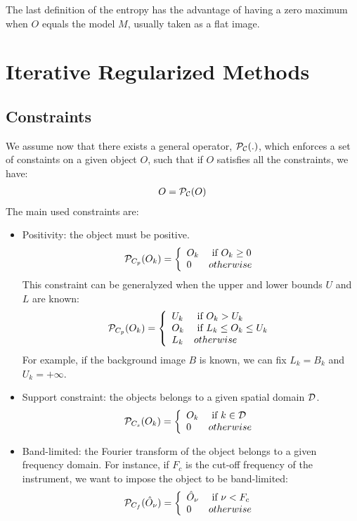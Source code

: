 \documentclass[11pt,a4paper]{article}
\begin{document}
The last definition of the entropy has the advantage of having a zero
maximum when $O$ equals the model $M$, usually taken as a flat image. 

\section{Iterative Regularized Methods}
\subsection{Constraints}
We assume now that there exists a general operator, ${\cal P_C}(.)$, which
enforces a set of constaints on a given object $O$, such that if $O$
satisfies all the constraints, we have:
\begin{eqnarray}
O  = {\cal P_C}(O)
\end{eqnarray}
The main used constraints are:
\begin{itemize}
\item{Positivity:} the object must be positive. 
\begin{eqnarray}
 {\cal P}_{C_p}(O_k) =  \left\{
  \begin{array}{ll}
    O_k   & \mbox{ if }  O_k \ge 0    \\
    0   &   otherwise
  \end{array}
  \right.
\end{eqnarray}
This constraint can be generalyzed when the upper and lower bounds 
$U$ and $L$ are known:
\begin{eqnarray}
 {\cal P}_{C_p}(O_k) =  \left\{
  \begin{array}{ll}
      U_k   &  \mbox{ if }  O_k > U_k    \\
     O_k  & \mbox{ if }   L_k \le O_k \le U_k    \\
      L_k   &   otherwise
  \end{array}
  \right.
\end{eqnarray}
For example, if the background image $B$ is known, we can fix
$L_k = B_k$ and $U_k = +\infty$.

\item{Support constraint:} 
the objects belongs to a given spatial domain ${\cal D}$.
\begin{eqnarray}
 {\cal P}_{C_s}(O_k) =  \left\{
  \begin{array}{ll}
   O_k    & \mbox{ if }  k \in {\cal D}    \\
   0   &  otherwise
  \end{array}
  \right.
\end{eqnarray}
\item{Band-limited:} the Fourier transform of the object belongs to a given
frequency domain. For instance, if $F_c$ is the cut-off frequency of the
instrument, we want to impose the object to be band-limited:
\begin{eqnarray}
 {\cal P}_{C_f}(\hat O_\nu) =  \left\{
  \begin{array}{ll}
    \hat O_\nu    & \mbox{ if }  \nu < F_c    \\
  0 &  otherwise
  \end{array}
  \right.
\end{eqnarray}
\end{itemize}
\end{document}
